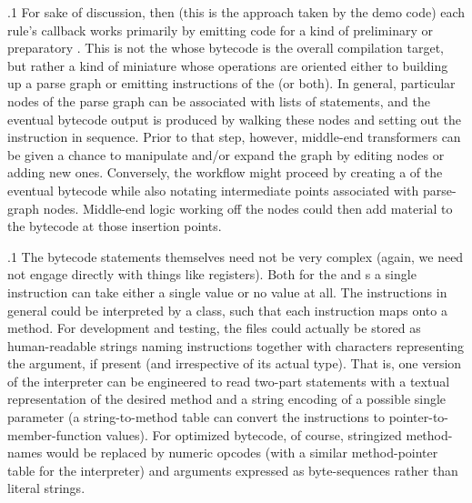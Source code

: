\documentclass[11pt, twocolumn]{article}
\begin{document}
\p.1{%
For sake of discussion, then (this is the approach taken by the demo code)
each rule's callback works primarily by emitting code for a kind
of preliminary or preparatory . This is not the  whose
bytecode is the overall compilation target, but rather a kind of
miniature  whose operations are oriented either to
building up a parse graph or emitting instructions of the 
 (or both). In general, particular nodes of the parse graph
can be associated with lists of  statements, and the eventual
bytecode output is produced by walking these nodes and setting
out the instruction in sequence. Prior to that step, however,
middle-end transformers can be given a chance to manipulate and/or
expand the graph by editing nodes or adding new ones. Conversely, the
workflow might proceed by creating a  of the
eventual bytecode while also notating intermediate points
associated with parse-graph nodes. Middle-end logic working
off the nodes could then add material to the bytecode at
those insertion points.
}%

\p.1{%
The bytecode statements themselves need not be very complex
(again, we need not engage directly with things like
 registers). Both for the  and 
s a single instruction can take either a single value
or no value at all. The instructions in general could
be interpreted by a  class, such that each instruction
maps onto a  method. For development and testing,
the  files could actually be stored
as human-readable strings naming instructions together
with characters representing the argument, if present
(and irrespective of its actual type). That is,
one version of the  interpreter can be
engineered to read two-part statements with a
textual representation of the desired method
and a string encoding of a possible
single parameter (a string-to-method table
can convert the instructions to pointer-to-member-function
values). For optimized bytecode, of course,
stringized method-names would be replaced by
numeric opcodes (with a similar method-pointer
table for the interpreter) and arguments
expressed as byte-sequences rather than literal strings.
}%
\end{document}
